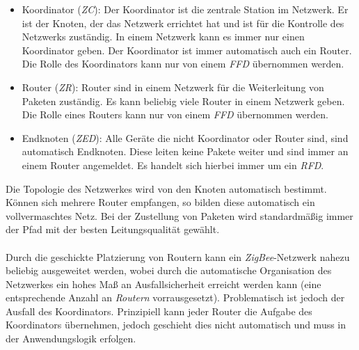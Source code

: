                 \begin{itemize}
                    \item{Koordinator (\emph{ZC}):} Der Koordinator ist die zentrale Station im Netzwerk.
                                        Er ist der Knoten, der das Netzwerk errichtet hat
                                        und ist für die Kontrolle des Netzwerks zuständig.
                                        In einem Netzwerk kann es immer nur einen Koordinator
                                        geben. Der Koordinator ist immer automatisch auch
                                        ein Router. Die Rolle des Koordinators kann nur von einem
                                        \emph{FFD} übernommen werden.
                    \item{Router (\emph{ZR}):} Router sind in einem Netzwerk für die Weiterleitung von
                                   Paketen zuständig. Es kann beliebig viele Router in einem
                                   Netzwerk geben. Die Rolle eines Routers kann nur von einem
                                   \emph{FFD} übernommen werden.
                    \item{Endknoten (\emph{ZED}):} Alle Geräte die nicht Koordinator oder Router sind,
                                            sind automatisch Endknoten. Diese leiten keine Pakete
                                            weiter und sind immer an einem Router angemeldet.
                                            Es handelt sich hierbei immer um ein \emph{RFD}.
                \end{itemize}

                Die Topologie des Netzwerkes wird von den Knoten automatisch bestimmt. Können
                sich mehrere Router empfangen, so bilden diese automatisch ein vollvermaschtes
                Netz. Bei der Zustellung von Paketen wird standardmäßig immer der Pfad mit
                der besten Leitungsqualität gewählt.\\
                \\
                Durch die geschickte Platzierung von Routern kann ein \emph{ZigBee}-Netzwerk
                nahezu beliebig ausgeweitet werden, wobei durch die automatische Organisation
                des Netzwerkes ein hohes Maß an Ausfallsicherheit erreicht werden kann (eine entsprechende
                Anzahl an \emph{Routern} vorrausgesetzt). Problematisch ist jedoch der Ausfall des
                Koordinators. Prinzipiell kann jeder Router die Aufgabe des Koordinators übernehmen,
                jedoch geschieht dies nicht automatisch und muss in der Anwendungslogik erfolgen.

